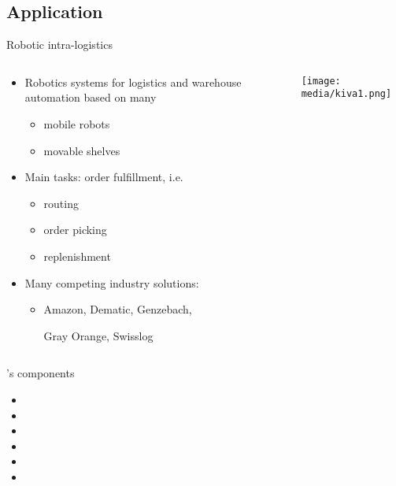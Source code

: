 \subsection{Application}
\begin{frame}[label=asprilo]{Robotic intra-logistics}
  \begin{columns}
    \begin{column}{0.69\textwidth}
      \begin{itemize}
      \item \alert{Robotics systems} for \alert{logistics} and \alert{warehouse automation}
        based on many
        \begin{itemize}
        \item mobile robots
        \item movable shelves
        \end{itemize}
        \smallskip
      \item Main tasks: \alert{order fulfillment}, i.e.
        \begin{itemize}
        \item routing
        \item order picking
        \item replenishment
        \end{itemize} %
        \smallskip
      \item Many competing \alert{industry solutions}:
        \begin{itemize}
        \item
          Amazon,
          Dematic,
          Genzebach,\par
          Gray Orange,
          Swisslog
        \end{itemize}
      \end{itemize}
    \end{column}
    \begin{column}{0.35\textwidth}  %
      \begin{center}
        \texttt{[image: media/kiva1.png]}
      \end{center}
    \end{column}
  \end{columns}
\end{frame}
\begin{frame}{\asprilo's components}
  \bigskip
  \begin{itemize}
  \item<1-> 
  \item<1-> 
  \item<1-> 
  \item<1-> 
  \item<1-> 
    \bigskip
  \item<1->
  \end{itemize}
\end{frame}
